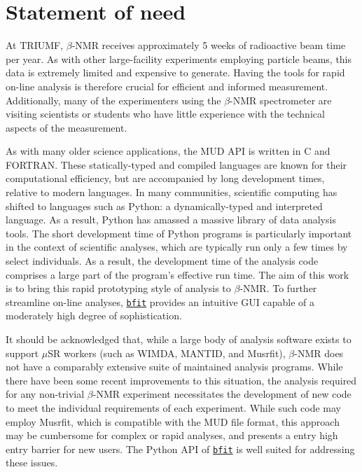 \documentclass[aps, prb, twocolumn, reprint, superscriptaddress, floatfix, citeautoscript, longbibliography]{revtex4-1}
\begin{document}
\section{Statement of need}

At TRIUMF, $\beta$-NMR receives approximately 5 weeks of radioactive beam time per year. As with other large-facility experiments employing particle beams, this data is extremely limited and expensive to generate. Having the tools for rapid on-line analysis is therefore crucial for efficient and informed measurement. Additionally, many of the experimenters using the $\beta$-NMR spectrometer are visiting scientists or students who have little experience with the technical aspects of the measurement.

As with many older science applications, the MUD API is written in C and FORTRAN. These statically-typed and compiled languages are known for their computational efficiency, but are accompanied by long development times, relative to modern languages. In many communities, scientific computing has shifted to languages such as Python: a dynamically-typed and interpreted language. As a result, Python has amassed a massive library of data analysis tools\cite{Virtanen2020}. The short development time of Python programs is particularly important in the context of scientific analyses, which are typically run only a few times by select individuals. As a result, the development time of the analysis code comprises a large part of the program's effective run time. The aim of this work is to bring this rapid prototyping style of analysis to $\beta$-NMR. To further streamline on-line analyses, \href{https://github.com/dfujim/bfit}{\texttt{bfit}} provides an intuitive GUI capable of a moderately high degree of sophistication.

It should be acknowledged that, while a large body of analysis software exists to support $\mu$SR workers (such as WIMDA\cite{Pratt2000}, MANTID\cite{Arnold2014}, and Musrfit\cite{Suter2012}), $\beta$-NMR does not have a comparably extensive suite of maintained analysis programs. While there have been some recent improvements to this situation\cite{Saadaoui2018}, the analysis required for any non-trivial $\beta$-NMR experiment necessitates the development of new code to meet the individual requirements of each experiment. While such code may employ Musrfit, which is compatible with the MUD file format, this approach may be cumbersome for complex or rapid analyses, and presents a entry high entry barrier for new users. The Python API of \href{https://github.com/dfujim/bfit}{\texttt{bfit}} is well suited for addressing these issues.
\end{document}
